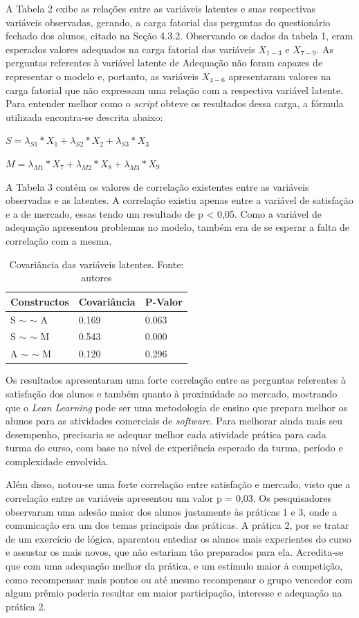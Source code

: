 A Tabela 2 exibe as relações entre as variáveis latentes e suas respectivas variáveis observadas, gerando, a carga fatorial das perguntas do questionário fechado dos alunos, citado na Seção 4.3.2. Observando os dados da tabela 1, eram esperados valores adequados na carga fatorial das variáveis $X_{1-3}$ e $X_{7-9}$. As perguntas referentes à variável latente de Adequação não foram capazes de representar o modelo e, portanto, as variáveis $X_{4-6}$ apresentaram valores na carga fatorial que não expressam uma relação com a respectiva variável latente. Para entender melhor como o \textit{script} obteve os resultados dessa carga, a fórmula utilizada encontra-se descrita abaixo:

$S  = \lambda_{S1} * X_{1} + \lambda_{S2} * X_{2} + \lambda_{S3} * X_{3}$

$M  = \lambda_{M1} * X_{7} + \lambda_{M2} * X_{8} + \lambda_{M3} * X_{9}$

A Tabela 3 contém os valores de correlação existentes entre as variáveis observadas e as latentes. A correlação existiu apenas entre a variável de satisfação e a de mercado, essas tendo um resultado de p \textless{ }0,05. Como a variável de adequação apresentou problemas no modelo, também era de se esperar a falta de correlação com a mesma.

\begin{table}[!ht]
\centering
\begin{tabular}{|l|l|l|}
\hline
Constructos     & Covariância & P-Valor \\ \hline
S $\sim$ $\sim$ A & 0.169       & 0.063   \\ \hline
S $\sim$ $\sim$ M & 0.543       & 0.000   \\ \hline
A $\sim$ $\sim$ M & 0.120       & 0.296   \\ \hline
\end{tabular}
\caption{Covariância das variáveis latentes. Fonte: autores}
\end{table}

Os resultados apresentaram uma forte correlação entre as perguntas referentes à satisfação dos alunos e também quanto à proximidade ao mercado, mostrando que o \textit{Lean Learning} pode ser uma metodologia de ensino que prepara melhor os alunos para as atividades comerciais de \textit{software}. Para melhorar ainda mais seu desempenho, precisaria se adequar melhor cada atividade prática para cada turma do curso, com base no nível de experiência esperado da turma, período e complexidade envolvida.

Além disso, notou-se uma forte correlação entre satisfação e mercado, visto que a correlação entre as variáveis apresentou um valor p = 0,03. Os pesquisadores observaram uma adesão maior dos alunos justamente às práticas 1 e 3, onde a comunicação era um dos temas principais das práticas. A prática 2, por se tratar de um exercício de lógica, aparentou entediar os alunos mais experientes do curso e assustar os mais novos, que não estariam tão preparados para ela. Acredita-se que com uma adequação melhor da prática, e um estímulo maior à competição, como recompensar mais pontos ou até mesmo recompensar o grupo vencedor com algum prêmio poderia resultar em maior participação, interesse e adequação na prática 2.

